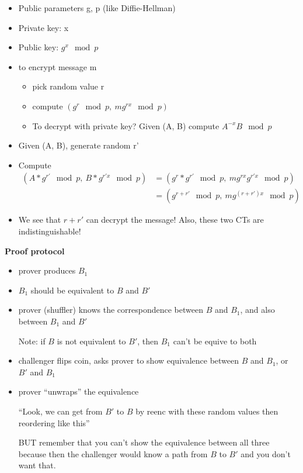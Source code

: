 \begin{itemize}
	\item Public parameters g, p (like Diffie-Hellman)
	\item Private key: x
	\item Public key: $g^x \mod p$
	\item to encrypt message m
		\begin{itemize}
			\item pick random value r
			\item compute $(g^r \mod p,\ mg^{rx} \mod p)$
			\item To decrypt with private key? Given (A, B) compute $A^{-x}B \mod p$
		\end{itemize}
\end{itemize}

\begin{itemize}
	\item Given (A, B), generate random r'
	\item Compute
		\begin{align*}
		(A*g^{r'} \mod p,\ B * g^{r'x} \mod p) 
		&= (g^r * g^{r'} \mod p,\ m g^{rx} g^{r'x} \mod p)\\
		&= (g^{r+r'} \mod p,\ m g^{(r+r')x} \mod p)
		\end{align*}
	\item We see that $r+r'$ can decrypt the message! Also, these two CTs are indistinguishable!
\end{itemize}


\textbf{Proof protocol}
\begin{itemize}
	\item prover produces $B_1$
	\item $B_1$ should be equivalent to $B$ and $B'$
	\item prover (shuffler) knows the correspondence between $B$ and $B_1$, and also between $B_1$ and $B'$

	Note: if $B$ is not equivalent to $B'$, then $B_1$ can't be equive to both
	\item challenger flips coin, asks prover to show equivalence between $B$ and $B_1$, or $B'$ and $B_1$
	\item prover ``unwraps'' the equivalence

	``Look, we can get from $B'$ to $B$ by reenc with these random values then reordering like this''

	BUT remember that you can't show the equivalence between all three because then the challenger would know a path from $B$ to $B'$ and you don't want that.
\end{itemize}

